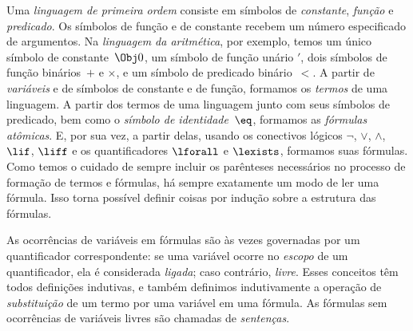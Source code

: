 Uma \emph{linguagem de primeira ordem} consiste em símbolos de \emph{constante},
\emph{função} e \emph{predicado}. Os símbolos de função e de constante
recebem um número especificado de argumentos. Na \emph{linguagem da
aritmética}, por exemplo, temos um único símbolo de constante~$\Obj 0$, um
símbolo de função unário $\prime$, dois símbolos de função binários~$+$ e
$\times$, e um símbolo de predicado binário~$<$. A partir de \emph{variáveis}
e de símbolos de constante e de função, formamos os \emph{termos} de uma
linguagem. A partir dos termos de uma linguagem junto com seus símbolos de predicado,
bem como o \emph{símbolo de identidade}~$\eq$, formamos as
\emph{fórmulas atômicas}. E, por sua vez, a partir delas, usando os conectivos
lógicos $\lnot$, $\lor$, $\land$, $\lif$, $\liff$ e os
quantificadores $\lforall$ e $\lexists$, formamos suas fórmulas. Como
temos o cuidado de sempre incluir os parênteses necessários no processo de
formação de termos e fórmulas, há sempre exatamente um modo de ler
uma fórmula. Isso torna possível definir coisas por indução sobre a
estrutura das fórmulas.

As ocorrências de variáveis em fórmulas são às vezes governadas por um
quantificador correspondente: se uma variável ocorre no \emph{escopo} de
um quantificador, ela é considerada \emph{ligada}; caso contrário,
\emph{livre}. Esses conceitos têm todos definições indutivas, e
também definimos indutivamente a operação de \emph{substituição} de um termo
por uma variável em uma fórmula. As fórmulas sem ocorrências de variáveis
livres são chamadas de \emph{sentenças}.

